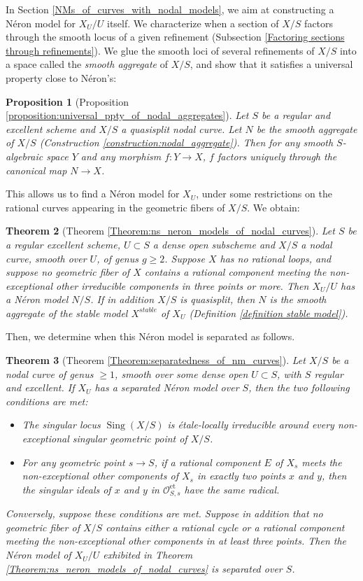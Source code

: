 \documentclass[a4paper,10pt,twoside]{article}
\newcommand{\on}[1]{\operatorname{#1}}
\renewcommand{\O}{\mathcal{O}}
\DeclareMathOperator{\sing}{Sing}
\newtheorem{thm}{Theorem}[section]
\newtheorem{prop}[thm]{Proposition}
\theoremstyle{definition}
\theoremstyle{remark}
\renewcommand{\on}[1]{\operatorname{#1}}
\begin{document}
In Section \ref{NMs_of_curves_with_nodal_models}, we aim at constructing a Néron model for $X_U/U$ itself. We characterize when a section of $X/S$ factors through the smooth locus of a given refinement (Subsection \ref{Factoring sections through refinements}). We glue the smooth loci of several refinements of $X/S$ into a space called the \emph{smooth aggregate} of $X/S$, and show that it satisfies a universal property close to Néron's:

\begin{prop}[Proposition \ref{proposition:universal_ppty_of_nodal_aggregates}]
Let $S$ be a regular and excellent scheme and $X/S$ a quasisplit nodal curve. Let $N$ be the smooth aggregate of $X/S$ (Construction \ref{construction:nodal_aggregate}). Then for any smooth $S$-algebraic space $Y$ and any morphism $f\colon Y\to X$, $f$ factors uniquely through the canonical map $N\to X$.
\end{prop}

This allows us to find a Néron model for $X_U$, under some restrictions on the rational curves appearing in the geometric fibers of $X/S$. We obtain:

\begin{thm}[Theorem \ref{Theorem:ns_neron_models_of_nodal_curves}]
Let $S$ be a regular excellent scheme, $U\subset S$ a dense open subscheme and $X/S$ a nodal curve, smooth over $U$, of genus $g\geq 2$. Suppose $X$ has no rational loops, and suppose no geometric fiber of $X$ contains a rational component meeting the non-exceptional other irreducible components in three points or more. Then $X_U/U$ has a N\'eron model $N/S$. If in addition $X/S$ is quasisplit, then $N$ is the smooth aggregate of the stable model $X^{stable}$ of $X_U$ (Definition \ref{definition stable model}).
\end{thm}

Then, we determine when this Néron model is separated as follows.

\begin{thm}[Theorem \ref{Theorem:separatedness_of_nm_curves}]
Let $X/S$ be a nodal curve of genus $\geq 1$, smooth over some dense open $U\subset S$, with $S$ regular and excellent. If $X_U$ has a separated N\'eron model over $S$, then the two following conditions are met:
\begin{itemize}
\item The singular locus $\sing(X/S)$ is étale-locally irreducible around every non-exceptional singular geometric point of $X/S$.
\item For any geometric point $s\to S$, if a rational component $E$ of $X_s$ meets the non-exceptional other components of $X_s$ in exactly two points $x$ and $y$, then the singular ideals of $x$ and $y$ in $\O_{S,s}^{\on{et}}$ have the same radical.
\end{itemize}

Conversely, suppose these conditions are met. Suppose in addition that no geometric fiber of $X/S$ contains either a rational cycle or a rational component meeting the non-exceptional other components in at least three points. Then the N\'eron model of $X_U/U$ exhibited in Theorem \ref{Theorem:ns_neron_models_of_nodal_curves} is separated over $S$.
\end{thm}
\end{document}
